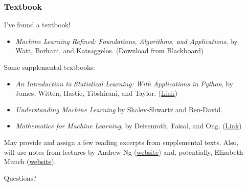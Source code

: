 \documentclass{beamer}
\theoremstyle{example}
\begin{document}
\begin{frame}
\frametitle{Textbook}
I've found a textbook!
\begin{itemize}
    \item \textit{Machine Learning Refined: Foundations, Algorithms, and Applications}, by Watt, Borhani, and Katsaggelos. ({\color{comments}Download from Blackboard})
\end{itemize} 

\pause
Some supplemental textbooks: 

\begin{itemize}
    \item \textit{An Introduction to Statistical Learning: With Applications in Python}, by James, Witten, Hastie, Tibshirani, and Taylor. (\href{https://www.statlearning.com/}{Link})
    \item \textit{Understanding Machine Learning} by Shalev-Shwartz and Ben-David.
    \item \textit{Mathematics for Machine Learning}, by Deisenroth, Faisal, and Ong. (\href{https://github.com/mml-book/mml-book.github.io/blob/master/book/mml-book.pdf}{Link})
\end{itemize}

\pause
May provide and assign a few reading excerpts from supplemental texts. Also, will use notes from lectures by Andrew Ng (\href{https://hai.stanford.edu/people/andrew-ng}{website}) and, potentially, Elizabeth Munch (\href{https://elizabethmunch.com}{website}). 
\end{frame}

%
%
{
\begin{frame}[standout]
    Questions?
\end{frame}
}
\end{document}
